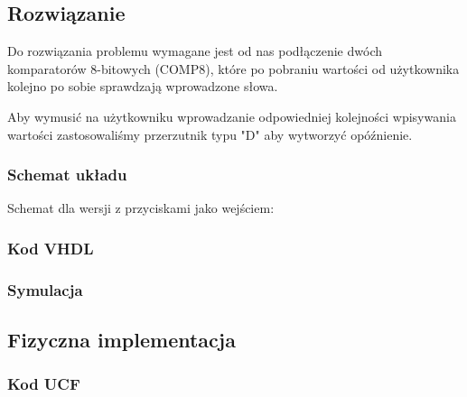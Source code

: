 \documentclass[a4paper,12pt]{extarticle}  %
\begin{document}
\subsection{Rozwiązanie}
Do rozwiązania problemu wymagane jest od nas podłączenie dwóch komparatorów 8-bitowych (COMP8), 
które po pobraniu wartości od użytkownika kolejno po sobie sprawdzają wprowadzone słowa.

Aby wymusić na użytkowniku wprowadzanie odpowiedniej kolejności wpisywania wartości zastosowaliśmy przerzutnik typu "D" aby wytworzyć opóźnienie.

\subsubsection{Schemat układu}
Schemat dla wersji z przyciskami jako wejściem:
\begin{figure}[H]
	\centering
\end{figure}
\subsubsection{Kod VHDL}

\subsubsection{Symulacja}
\begin{figure}[H]
	\centering
\end{figure}
\subsection{Fizyczna implementacja}
\subsubsection{Kod UCF}

\end{document}
